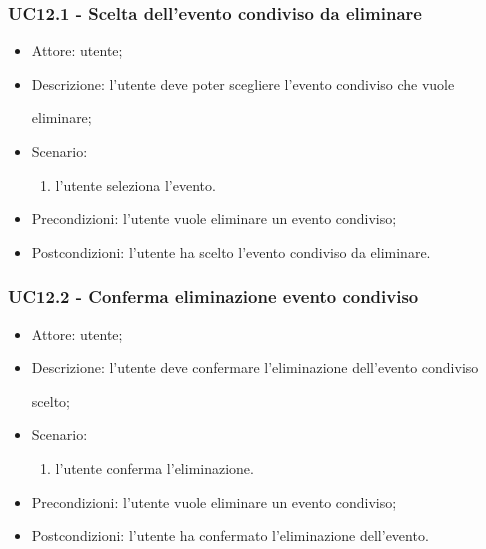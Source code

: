 \subsubsection{UC12.1 - Scelta dell'evento condiviso da eliminare} \label{sec: UC12.1}
\begin{itemize}
    \item Attore: utente;
    \item Descrizione: l'utente deve poter scegliere l'evento condiviso che vuole \par eliminare;
    \item Scenario:
        \begin{enumerate}
        \item l'utente seleziona l'evento.
        \end{enumerate}
    
    \item Precondizioni: l'utente vuole eliminare un evento condiviso;
    \item Postcondizioni: l'utente ha scelto l'evento condiviso da eliminare.
\end{itemize}


\subsubsection{UC12.2 - Conferma eliminazione evento condiviso} \label{sec: UC12.2}
\begin{itemize}
    \item Attore: utente;
    \item Descrizione: l'utente deve confermare l'eliminazione dell'evento condiviso \par scelto;
    \item Scenario:
        \begin{enumerate}
        \item l'utente conferma l'eliminazione.
        \end{enumerate}
    
    \item Precondizioni: l'utente vuole eliminare un evento condiviso;
    \item Postcondizioni: l'utente ha confermato l'eliminazione dell'evento.
\end{itemize}


